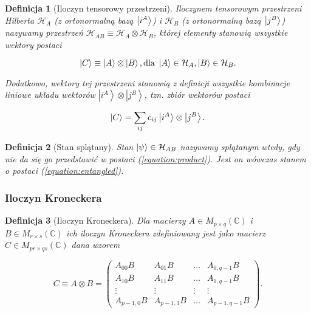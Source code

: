 \documentclass[a4paper,12pt]{article}
\newtheorem{definition}{Definicja}
\begin{document}
\begin{definition}[Iloczyn tensorowy przestrzeni]
    Iloczynem tensorowym przestrzeni Hilberta $\mathcal{H}_A$ (z ortonormalną bazą $\ket{i^{A}}$) i $\mathcal{H}_B$ (z ortonormalną bazą $\ket{j^{B}}$) nazywamy przestrzeń $\mathcal{H}_{AB} \equiv \mathcal{H}_A \otimes \mathcal{H}_B$, której elementy stanowią wszystkie wektory postaci

    \begin{equation}
        \label{equation:product}
        \ket{C} \equiv \ket{A} \otimes \ket{B}, \textrm{dla } \ket{A} \in \mathcal{H}_A, \ket{B} \in \mathcal{H}_B.
    \end{equation}

    Dodatkowo, wektory tej przestrzeni stanowią z definicji wszystkie kombinacje liniowe układu wektorów $\left|i^{A}\right\rangle\otimes\left|j^{B}\right\rangle$, tzn. zbiór wektorów postaci

    \begin{equation}
        \label{equation:entangled}
        \ket{C} = \sum\limits_{ij} c_{ij} \ket{i ^ {A}} \otimes \ket{j ^ {B}}.
    \end{equation}
\end{definition}

\begin{definition}[Stan splątany]
    Stan $\ket{\psi} \in \mathcal{H}_{AB}$ nazywamy splątanym wtedy, gdy nie da się go przedstawić w postaci (\ref{equation:product}). Jest on wówczas stanem o postaci (\ref{equation:entangled}).
\end{definition}

\subsubsection{Iloczyn Kroneckera}

\begin{definition}[Iloczyn Kroneckera]
    Dla macierzy $A \in M_{p \times q}(\mathbb{C})$ i $B \in M_{r\times s}(\mathbb{C})$ ich iloczyn Kroneckera zdefiniowany jest jako macierz $C \in M_{pr\times qs}(\mathbb{C})$ dana wzorem

    $$
        C \equiv A \otimes B =
        \begin{pmatrix}
            A_{00} B & A_{01} B & \ldots & A_{0, q - 1} B \\
            A_{10} B & A_{11} B & \ldots & A_{1, q - 1} B \\
            \vdots & \vdots & \vdots & \vdots \\
            A_{p - 1, 0} B & A_{p - 1, 1} B & \ldots & A_{p - 1, q - 1} B
        \end{pmatrix}.
    $$
\end{definition}
\end{document}
